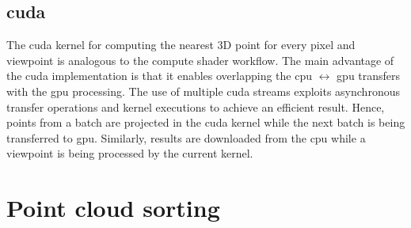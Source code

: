 \subsection{\acrshort{cuda}}

The \acrshort{cuda} kernel for computing the nearest 3D point for every pixel and viewpoint is analogous to the compute shader workflow. The main advantage of the \acrshort{cuda} implementation is that it enables overlapping the \acrshort{cpu} $\leftrightarrow$ \acrshort{gpu} transfers with the \acrshort{gpu} processing. The use of multiple \acrshort{cuda} streams exploits asynchronous transfer operations and kernel executions to achieve an efficient result. Hence, points from a batch are projected in the \acrshort{cuda} kernel while the next batch is being transferred to \acrshort{gpu}. Similarly, results are downloaded from the \acrshort{cpu} while a viewpoint is being processed by the current kernel.


% 

\section{Point cloud sorting}

